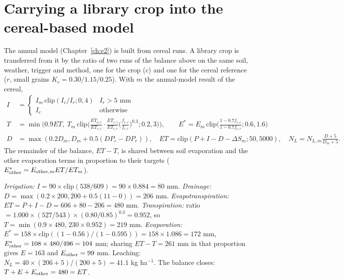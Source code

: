 \section{Carrying a library crop into the cereal-based model}
The annual model (Chapter~\ref{ch:e2}) is built from cereal runs. A library crop is transferred from it by the ratio of two runs of the balance above on the same soil, weather, trigger and method, one for the crop ($c$) and one for the cereal reference ($r$, small grains $K_c=0.30/1.15/0.25$). With $m$ the annual-model result of the cereal,
\begin{align}I&=\begin{cases}I_m\,\mathrm{clip}(I_c/I_r;0,4)&I_r>5\text{ mm}\\I_c&\text{otherwise}\end{cases}\\
T&=\min\Big(0.9ET,\;T_m\,\mathrm{clip}\Big(\frac{ET_{a,c}}{ET_{c,c}}\cdot\frac{ET_{c,c}}{ET_{c,r}}\Big(\frac{f_{c,c}}{f_{c,r}}\Big)^{0.3};0.2,3\Big)\Big),\qquad E^*=E_m\,\mathrm{clip}\Big(\frac{1-0.7f_{c,c}}{1-0.7f_{c,r}};0.6,1.6\Big)\\
D&=\max(0.2D_m,D_m+0.5(DP_c-DP_r)),\quad ET=\mathrm{clip}(P+I-D-\Delta S_m;50,5000),\quad N_L=N_{L,m}\frac{D+5}{D_m+5}.\end{align}
The remainder of the balance, $ET-T$, is shared between soil evaporation and the other evaporation terms in proportion to their targets ($E_{\rm other}^*=E_{{\rm other},m}ET/ET_m$).

\sol  \emph{Irrigation:} $I=90\times\mathrm{clip}(538/609)=90\times0.884=80$ mm. \emph{Drainage:} $D=\max(0.2\times200,200+0.5(11-0))=206$ mm. \emph{Evapotranspiration:} $ET=P+I-D=606+80-206=480$ mm. \emph{Transpiration:} ratio $=1.000\times(527/543)\times(0.80/0.85)^{0.3}=0.952$, so $T=\min(0.9\times480,\,230\times0.952)=219$ mm. \emph{Evaporation:} $E^*=158\times\mathrm{clip}((1-0.56)/(1-0.595))=158\times1.086=172$ mm, $E^*_{\rm other}=108\times480/496=104$ mm; sharing $ET-T=261$ mm in that proportion gives $E=163$ and $E_{\rm other}=99$ mm. Leaching: $N_L=40\times(206+5)/(200+5)=41.1$ kg ha$^{-1}$. The balance closes: $T+E+E_{\rm other}=480=ET$.


